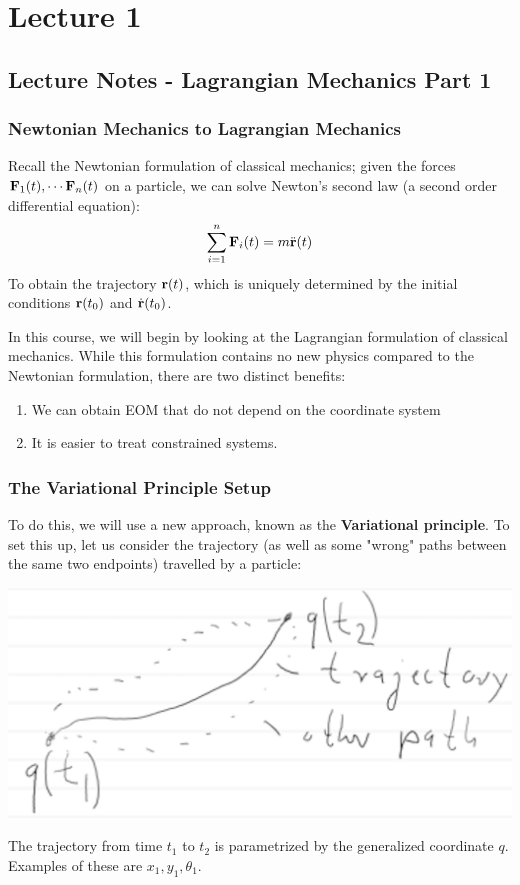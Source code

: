 \documentclass[../PHYS306Notes.tex]{subfiles}
\begin{document}
\section{Lecture 1}
\subsection{Lecture Notes - Lagrangian Mechanics Part 1}
\subsubsection{Newtonian Mechanics to Lagrangian Mechanics}
Recall the Newtonian formulation of classical mechanics; given the forces $\mathbf{F}_1(t), \cdots \mathbf{F}_n(t)$ on a particle, we can solve Newton's second law (a second order differential equation):
\[\sum_{i=1}^n \mathbf{F}_i(t) = m \ddot{\mathbf{r}}(t)\]
To obtain the trajectory $\mathbf{r}(t)$, which is uniquely determined by the initial conditions $\mathbf{r}(t_0)$ and $\dot{\mathbf{r}}(t_0)$. 

In this course, we will begin by looking at the Lagrangian formulation of classical mechanics. While this formulation contains no new physics compared to the Newtonian formulation, there are two distinct benefits:
\begin{enumerate}
    \item We can obtain EOM that do not depend on the coordinate system
    \item It is easier to treat constrained systems. 
\end{enumerate}
\subsubsection{The Variational Principle Setup}
To do this, we will use a new approach, known as the \textbf{Variational principle}. To set this up, let us consider the trajectory (as well as some "wrong" paths between the same two endpoints) travelled by a particle:
\begin{center}
    \includegraphics[scale=0.4]{Lecture-1/L1-img1.png}
\end{center}
The trajectory from time $t_1$ to $t_2$ is parametrized by the generalized coordinate $q$. Examples of these are $x_1, y_1, \theta_1$. 
\end{document}
